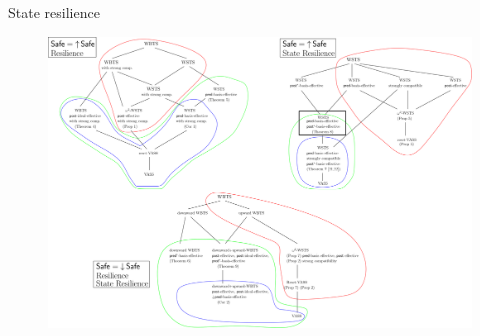 \documentclass{beamer}
\begin{document}
  \begin{frame}{State resilience}
 
   \begin{center}
 	\begin{figure}
 	\vspace{-0.25cm}
\includegraphics[width=1.00\textwidth]{resultB}
	\end{figure}
\end{center}  




  \end{frame}
\end{document}
